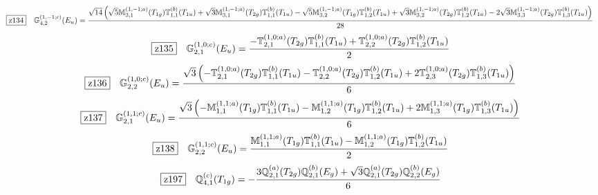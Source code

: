 \documentclass[fleqn,10pt,landscape]{jsarticle}
\begin{document}
\begin{dmath*}
\hspace*{3mm}\fbox{z134}\quad \mathbb{G}_{4,2}^{(1,-1;c)}(E_{u})=\frac{\sqrt{14} \left(\sqrt{5} \mathbb{M}_{3,1}^{(1,-1;a)}(T_{1g}) \mathbb{T}_{1,1}^{(b)}(T_{1u}) + \sqrt{3} \mathbb{M}_{3,1}^{(1,-1;a)}(T_{2g}) \mathbb{T}_{1,1}^{(b)}(T_{1u}) - \sqrt{5} \mathbb{M}_{3,2}^{(1,-1;a)}(T_{1g}) \mathbb{T}_{1,2}^{(b)}(T_{1u}) + \sqrt{3} \mathbb{M}_{3,2}^{(1,-1;a)}(T_{2g}) \mathbb{T}_{1,2}^{(b)}(T_{1u}) - 2 \sqrt{3} \mathbb{M}_{3,3}^{(1,-1;a)}(T_{2g}) \mathbb{T}_{1,3}^{(b)}(T_{1u})\right)}{28}
\end{dmath*}
\begin{dmath*}
\hspace*{3mm}\fbox{z135}\quad \mathbb{G}_{2,1}^{(1,0;c)}(E_{u})=\frac{- \mathbb{T}_{2,1}^{(1,0;a)}(T_{2g}) \mathbb{T}_{1,1}^{(b)}(T_{1u}) + \mathbb{T}_{2,2}^{(1,0;a)}(T_{2g}) \mathbb{T}_{1,2}^{(b)}(T_{1u})}{2}
\end{dmath*}
\begin{dmath*}
\hspace*{3mm}\fbox{z136}\quad \mathbb{G}_{2,2}^{(1,0;c)}(E_{u})=\frac{\sqrt{3} \left(- \mathbb{T}_{2,1}^{(1,0;a)}(T_{2g}) \mathbb{T}_{1,1}^{(b)}(T_{1u}) - \mathbb{T}_{2,2}^{(1,0;a)}(T_{2g}) \mathbb{T}_{1,2}^{(b)}(T_{1u}) + 2 \mathbb{T}_{2,3}^{(1,0;a)}(T_{2g}) \mathbb{T}_{1,3}^{(b)}(T_{1u})\right)}{6}
\end{dmath*}
\begin{dmath*}
\hspace*{3mm}\fbox{z137}\quad \mathbb{G}_{2,1}^{(1,1;c)}(E_{u})=\frac{\sqrt{3} \left(- \mathbb{M}_{1,1}^{(1,1;a)}(T_{1g}) \mathbb{T}_{1,1}^{(b)}(T_{1u}) - \mathbb{M}_{1,2}^{(1,1;a)}(T_{1g}) \mathbb{T}_{1,2}^{(b)}(T_{1u}) + 2 \mathbb{M}_{1,3}^{(1,1;a)}(T_{1g}) \mathbb{T}_{1,3}^{(b)}(T_{1u})\right)}{6}
\end{dmath*}
\begin{dmath*}
\hspace*{3mm}\fbox{z138}\quad \mathbb{G}_{2,2}^{(1,1;c)}(E_{u})=\frac{\mathbb{M}_{1,1}^{(1,1;a)}(T_{1g}) \mathbb{T}_{1,1}^{(b)}(T_{1u}) - \mathbb{M}_{1,2}^{(1,1;a)}(T_{1g}) \mathbb{T}_{1,2}^{(b)}(T_{1u})}{2}
\end{dmath*}
\begin{dmath*}
\hspace*{3mm}\fbox{z197}\quad \mathbb{Q}_{4,1}^{(c)}(T_{1g})=- \frac{3 \mathbb{Q}_{2,1}^{(a)}(T_{2g}) \mathbb{Q}_{2,1}^{(b)}(E_{g}) + \sqrt{3} \mathbb{Q}_{2,1}^{(a)}(T_{2g}) \mathbb{Q}_{2,2}^{(b)}(E_{g})}{6}
\end{dmath*}
\end{document}
